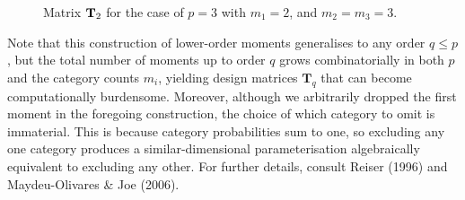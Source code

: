 \documentclass[
  letterpaper,
  DIV=11,
  numbers=noendperiod]{scrartcl}
\begin{document}
\begin{figure}


\caption{\label{fig-T2-matrix}Matrix \({\mathbf T}_2\) for the case of \(p=3\)
with \(m_1=2\), and \(m_2=m_3=3\).}

\end{figure}%

Note that this construction of lower-order moments generalises to any
order \(q \le p\), but the total number of moments up to order \(q\)
grows combinatorially in both \(p\) and the category counts \(m_i\),
yielding design matrices \(\mathbf{T}_q\) that can become
computationally burdensome. Moreover, although we arbitrarily dropped
the first moment in the foregoing construction, the choice of which
category to omit is immaterial. This is because category probabilities
sum to one, so excluding any one category produces a similar-dimensional
parameterisation algebraically equivalent to excluding any other. For
further details, consult Reiser (1996) and Maydeu-Olivares \& Joe
(2006).
\end{document}
